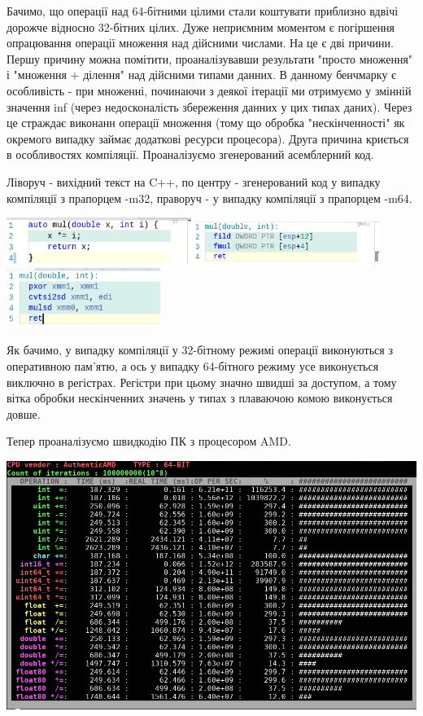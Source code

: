 Бачимо, що операції над 64-бітними цілими стали коштувати приблизно вдвічі дорожче відносно 32-бітних цілих. Дуже неприємним моментом є погіршення опрацювання операції множення над дійсними числами. На це є дві причини. Першу причину можна помітити, проаналізувавши результати "просто множення" і "множення + ділення" над дійсними типами данних.  В данному бенчмарку є особливість - при множенні, починаючи з деякої ітерації ми отримуємо у змінній значення inf (через недосконалість збереження данних у цих типах даних). Через це страждає виконанн операції множення (тому що обробка "нескінченності" як окремого випадку займає додаткові ресурси процесора). 
Друга причина криється в особливостях компіляції. Проаналізуємо згенерований асемблерний код.

Ліворуч - вихідний текст на C++, по центру - згенерований код у випадку компіляції з прапорцем -m32, праворуч - у випадку компіляції з прапорцем -m64. 


\includegraphics[width = 6cm]{img/screencpp.png}
\includegraphics[width = 6cm]{img/screenAsm32.png}
\includegraphics[width = 5cm]{img/screenAsm64.png}

Як бачимо, у випадку компіляції у 32-бітному режимі операції виконуються з оперативною пам'ятю, а ось у випадку 64-бітного режиму усе виконується виключно в регістрах. Регістри при цьому значно швидші за доступом, а тому вітка обробки нескінченних значень у типах з плаваючою комою виконується довше.

Тепер проаналізуємо швидкодію ПК з процесором AMD.

\includegraphics[width = 16cm]{img/amd64.png}

